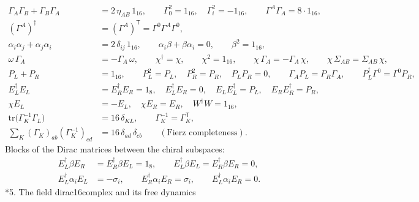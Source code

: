 \documentclass[10pt,a4paper]{article}
\makeatletter
\renewcommand\section{\@startsection{section}{1}{\z@}{-3.5ex \@plus -1ex \@minus -.2ex}{2.3ex \@plus.2ex}{\normalfont\Large\bfseries\raggedright}}
\makeatother
\begin{document}
\begin{align*}
\Gamma_A\Gamma_B+\Gamma_B\Gamma_A&=2\,\eta_{AB}\,1_{16},\qquad \Gamma_0^2=1_{16},\quad \Gamma_i^2=-1_{16},\qquad \Gamma^A\Gamma_A=8\cdot1_{16}, \\
(\Gamma^A)^\dagger&=(\Gamma^A)^{\mathsf T}=\Gamma^0\Gamma^A\Gamma^0, \\
\alpha_i\alpha_j+\alpha_j\alpha_i&=2\,\delta_{ij}\,1_{16},\qquad \alpha_i\beta+\beta\alpha_i=0,\qquad \beta^2=1_{16}, \\
\omega\,\Gamma_A&=-\Gamma_A\,\omega,\qquad \chi^\dagger=\chi,\qquad \chi^2=1_{16},\qquad \chi\,\Gamma_A=-\Gamma_A\,\chi,\qquad \chi\,\Sigma_{AB}=\Sigma_{AB}\,\chi, \\
P_L+P_R&=1_{16},\qquad P_L^2=P_L,\quad P_R^2=P_R,\quad P_LP_R=0,\qquad \Gamma_AP_L=P_R\Gamma_A,\qquad P_L^\dagger\Gamma^0=\Gamma^0P_R, \\
E_L^\dagger E_L&=E_R^\dagger E_R=1_8,\quad E_L^\dagger E_R=0,\quad E_LE_L^\dagger=P_L,\quad E_RE_R^\dagger=P_R, \\
\chi E_L&=-E_L,\quad \chi E_R=E_R,\quad W^\dagger W=1_{16}, \\
\mathrm{tr}\big(\Gamma_K^{-1}\Gamma_L\big)&=16\,\delta_{KL},\qquad \Gamma_K^{-1}=\Gamma_K^{\mathsf T}, \\
\textstyle\sum_K(\Gamma_K)_{ab}(\Gamma_K^{-1})_{cd}&=16\,\delta_{ad}\,\delta_{cb}\qquad(\text{Fierz completeness}).
\end{align*}
Blocks of the Dirac matrices between the chiral subspaces:
\begin{align*}
E_L^\dagger\beta E_R&=E_R^\dagger\beta E_L=1_8,\qquad E_L^\dagger\beta E_L=E_R^\dagger\beta E_R=0, \\
E_L^\dagger\alpha_iE_L&=-\sigma_i,\qquad E_R^\dagger\alpha_iE_R=\sigma_i,\qquad E_L^\dagger\alpha_iE_R=0 .
\end{align*}
\section*{5. The field dirac16complex and its free dynamics}
\end{document}
